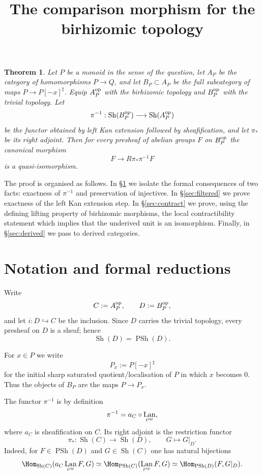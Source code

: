 \documentclass{article}
\title{The comparison morphism for the birhizomic topology}
\author{}
\date{}
\newtheorem{thm}{Theorem}
\theoremstyle{remark}
\DeclareMathOperator{\Sh}{Sh}
\DeclareMathOperator{\PSh}{PSh}
\DeclareMathOperator{\Lan}{Lan}
\begin{document}
\maketitle

\begin{thm}\label{thm:main}
Let $P$ be a monoid in the sense of the question, let $A_P$ be the category of homomorphisms $P\to Q$, and let $B_P\subset A_P$ be the full subcategory of maps $P\to P[-x]^\sharp$.  Equip $A_P^{\rm op}$ with the birhizomic topology and $B_P^{\rm op}$ with the trivial topology.  Let
\[
\pi^{-1}:\Sh(B_P^{\rm op})\longrightarrow \Sh(A_P^{\rm op})
\]
be the functor obtained by left Kan extension followed by sheafification, and let $\pi_*$ be its right adjoint.  Then for every presheaf of abelian groups $F$ on $B_P^{\rm op}$ the canonical morphism
\[
F\longrightarrow R\pi_*\pi^{-1}F
\]
is a quasi-isomorphism.
\end{thm}

The proof is organised as follows.  In \S\ref{sec:formal} we isolate the formal consequences of two facts: exactness of $\pi^{-1}$ and preservation of injectives.  In \S\ref{sec:filtered} we prove exactness of the left Kan extension step.  In \S\ref{sec:contract} we prove, using the defining lifting property of birhizomic morphisms, the local contractibility statement which implies that the underived unit is an isomorphism.  Finally, in \S\ref{sec:derived} we pass to derived categories.

\section{Notation and formal reductions}\label{sec:formal}

Write
\[
C:=A_P^{\rm op},\qquad D:=B_P^{\rm op},
\]
and let $i:D\hookrightarrow C$ be the inclusion.  Since $D$ carries the trivial topology, every presheaf on $D$ is a sheaf; hence
\[
\Sh(D)=\PSh(D).
\]

For $x\in P$ we write
\[
P_x:=P[-x]^\sharp
\]
for the initial sharp saturated quotient/localisation of $P$ in which $x$ becomes $0$.  Thus the objects of $B_P$ are the maps $P\to P_x$.

The functor $\pi^{-1}$ is by definition
\[
\pi^{-1}=a_C\circ \Lan_{i^{\rm op}},
\]
where $a_C$ is sheafification on $C$.  Its right adjoint is the restriction functor
\[
\pi_*:\Sh(C)\longrightarrow \Sh(D),\qquad G\longmapsto G|_D.
\]
Indeed, for $F\in \PSh(D)$ and $G\in \Sh(C)$ one has natural bijections
\[
\Hom_{\Sh(C)}(a_C\Lan_{i^{\rm op}}F,G)
\simeq
\Hom_{\PSh(C)}(\Lan_{i^{\rm op}}F,G)
\simeq
\Hom_{\PSh(D)}(F,G|_D).
\]
\end{document}

